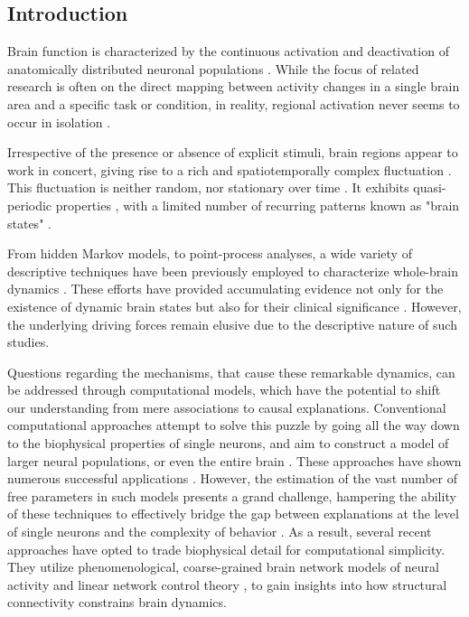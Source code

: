 \documentclass{article}
\begin{document}
\subsection{Introduction}\label{Introduction}

Brain function is characterized by the continuous activation and deactivation of anatomically distributed neuronal
populations \citep{buzsaki2006rhythms}.
While the focus of related research is often on the direct mapping between activity changes in a single brain
area and a specific task or condition, in reality, regional activation never seems to occur in isolation
\citep{bassett2017network}.

Irrespective of the presence or absence of explicit stimuli, brain regions appear to work in concert, giving rise to a
rich and spatiotemporally complex fluctuation \citep{gutierrez2019infraslow}.
This fluctuation is neither random, nor stationary over time \citep{liu2013time, zalesky2014time}.
It exhibits quasi-periodic properties \citep{thompson2014quasi}, with a limited number of
recurring patterns known as "brain states" \citep{greene2023everyone, vidaurre2017brain, liu2013time, richiardi2011decoding}.

From hidden Markov models, to point-process analyses, a wide variety of descriptive techniques have been previously
employed to characterize whole-brain dynamics \citep{smith2012temporally, vidaurre2017brain, liu2013time, chen2018human}.
These efforts have provided accumulating evidence not only for the existence of dynamic brain states but also for their clinical
significance \citep{hutchison2013dynamic, barttfeld2015signature, meer2020movie}.
However, the underlying driving forces remain elusive due to the descriptive nature of such studies.

Questions regarding the mechanisms, that cause these remarkable dynamics, can be addressed through computational models, which have the potential to shift our understanding from mere associations to causal explanations.
Conventional computational approaches attempt to solve this puzzle by going all the way down to the biophysical properties of single neurons, and aim to construct a model of larger neural populations, or even the entire brain
\citep{breakspear2017dynamic}.
These approaches have shown numerous successful applications \citep{murray2018biophysical, kriegeskorte2018cognitive, heinz2019towards}.
However, the estimation of the vast number of free parameters in such models presents a grand challenge, hampering the ability of these techniques to effectively bridge the gap between explanations at the level of single neurons and the complexity of behavior \citep{breakspear2017dynamic}. As a result, several recent approaches have opted to trade biophysical detail for computational simplicity. They utilize phenomenological, coarse-grained brain network models \citep{schirner2022dynamic, schiff1994controlling, papadopoulos2017development} of neural activity and linear network control theory  \citep{luppi2023transitions, chiem2021structure, gu2017optimal, scheid2021time, gu2015controllability}, to gain insights into how structural connectivity constrains brain dynamics.
\end{document}
